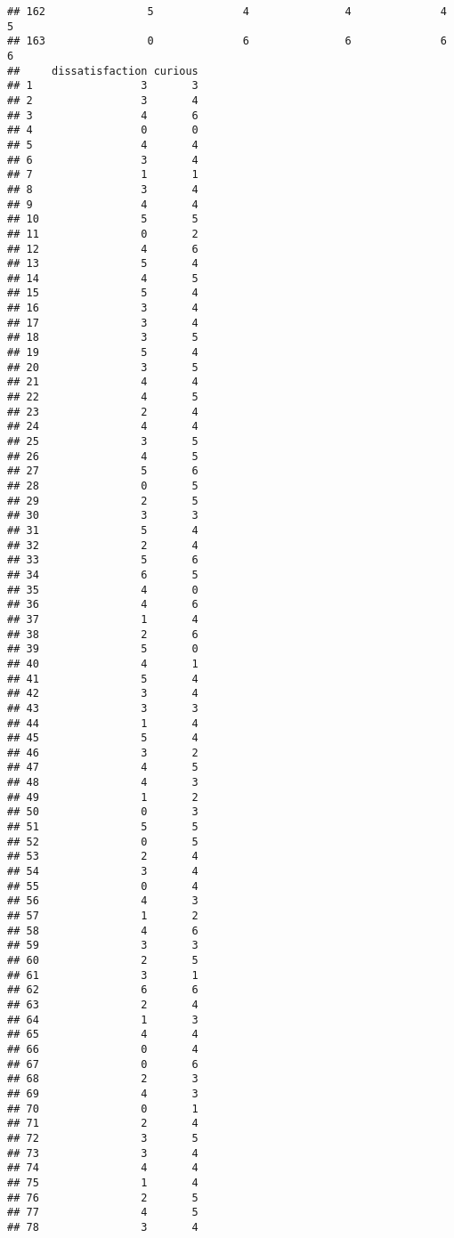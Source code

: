 \documentclass[
]{article}
\begin{document}
\begin{verbatim}
## 162                5              4               4              4       5
## 163                0              6               6              6       6
##     dissatisfaction curious
## 1                 3       3
## 2                 3       4
## 3                 4       6
## 4                 0       0
## 5                 4       4
## 6                 3       4
## 7                 1       1
## 8                 3       4
## 9                 4       4
## 10                5       5
## 11                0       2
## 12                4       6
## 13                5       4
## 14                4       5
## 15                5       4
## 16                3       4
## 17                3       4
## 18                3       5
## 19                5       4
## 20                3       5
## 21                4       4
## 22                4       5
## 23                2       4
## 24                4       4
## 25                3       5
## 26                4       5
## 27                5       6
## 28                0       5
## 29                2       5
## 30                3       3
## 31                5       4
## 32                2       4
## 33                5       6
## 34                6       5
## 35                4       0
## 36                4       6
## 37                1       4
## 38                2       6
## 39                5       0
## 40                4       1
## 41                5       4
## 42                3       4
## 43                3       3
## 44                1       4
## 45                5       4
## 46                3       2
## 47                4       5
## 48                4       3
## 49                1       2
## 50                0       3
## 51                5       5
## 52                0       5
## 53                2       4
## 54                3       4
## 55                0       4
## 56                4       3
## 57                1       2
## 58                4       6
## 59                3       3
## 60                2       5
## 61                3       1
## 62                6       6
## 63                2       4
## 64                1       3
## 65                4       4
## 66                0       4
## 67                0       6
## 68                2       3
## 69                4       3
## 70                0       1
## 71                2       4
## 72                3       5
## 73                3       4
## 74                4       4
## 75                1       4
## 76                2       5
## 77                4       5
## 78                3       4

\end{verbatim}
\end{document}
